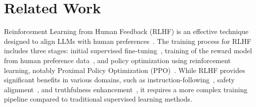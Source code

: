 \section{Related Work}
Reinforcement Learning from Human Feedback (RLHF) is an effective technique designed to align LLMs with human preferences~\citep{christiano2017deep}. 
The training process for RLHF includes three stages: initial supervised fine-tuning~\citep{zhou2024lima,xialess}, training of the reward model from human preference data~\citep{gao2023scaling,xiao2021general}, and policy optimization using reinforcement learning, notably Proximal Policy Optimization (PPO)~\citep{schulman2017proximal}. 
While RLHF provides significant benefits in various domains, such as instruction-following~\citep{ouyang2022training}, safety alignment~\citep{bai2022training}, and truthfulness enhancement~\citep{tian2023fine}, it requires a more complex training pipeline compared to traditional supervised learning methods. 



